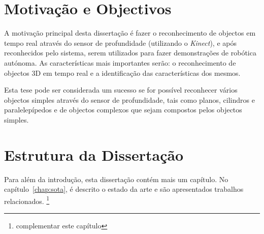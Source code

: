 \section{Motivação e Objectivos} \label{sec:goals}


A motivação principal desta dissertação é fazer o reconhecimento de objectos em tempo 
real através do sensor de profundidade (utilizando o \emph{Kinect}), e após reconhecidos
pelo sistema, serem utilizados para fazer demonstrações de robótica autónoma. As características
mais importantes serão: o reconhecimento de objectos 3D em tempo real e a identificação das
características dos mesmos.

Esta tese pode ser considerada um sucesso se for possível  reconhecer vários objectos simples
através do sensor de profundidade, tais como planos, cilindros e paralelepípedos e de objectos
complexos que sejam compostos pelos objectos simples.


\section{Estrutura da Dissertação} \label{sec:struct}

Para além da introdução, esta dissertação contém mais um capítulo.
No capítulo~\ref{chap:sota}, é descrito o estado da arte e são
apresentados trabalhos relacionados. \footnote{complementar este capítulo}
